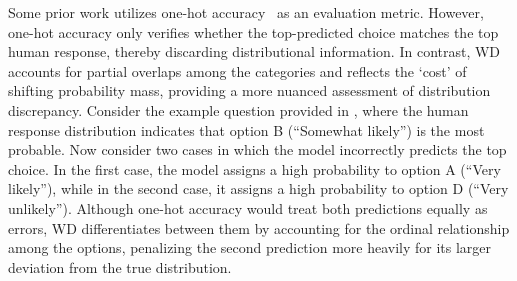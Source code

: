 Some prior work utilizes one-hot accuracy~\cite{feng-etal-2024-modular, li2023steerability} as an evaluation metric.
However, 
one-hot accuracy only verifies whether the top-predicted choice matches the top human response,
thereby discarding distributional information.
In contrast, WD accounts for partial overlaps among the categories and reflects the ‘cost’ of shifting probability mass, providing a more nuanced assessment of distribution discrepancy.
Consider the example question provided in , where the human response distribution indicates that option B (“Somewhat likely”) is the most probable. 
Now consider two cases in which the model incorrectly predicts the top choice. 
In the first case, the model assigns a high probability to option A (``Very likely''), while in the second case, it assigns a high probability to option D (``Very unlikely''). 
Although one-hot accuracy would treat both predictions equally as errors, WD differentiates between them by accounting for the ordinal relationship among the options, penalizing the second prediction more heavily for its larger deviation from the true distribution.